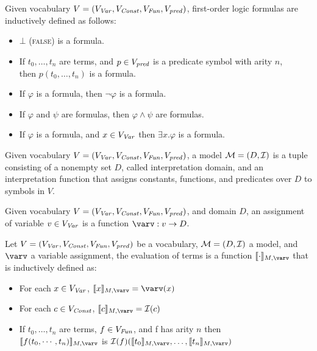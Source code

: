 \begin{mydef}[Formula]
	Given vocabulary $V = (V_{\mathit{Var}}, V_{\mathit{Const}}, V_{\mathit{Fun}}, V_{\mathit{pred}})$, first-order logic formulas are inductively defined as follows:
	\begin{itemize}
		\item $\bot$ (\textsc{false}) is a formula.
		\item If  $t_0, \ldots, t_n$ are terms, and $p \in V_{\mathit{pred}}$ is a predicate symbol with arity $n$, \\ then $p(t_0, \ldots, t_n)$ is a formula.
		\item If $\varphi$ is a formula, then $\neg \varphi$ is a formula.
		\item If $\varphi$ and $\psi$ are formulas, then $\varphi \land \psi$ are formulas.
		\item If $\varphi$ is a formula, and $x \in V_{\mathit{Var}}$ then $\exists x. \varphi$ is a formula.
	\end{itemize}
\end{mydef} \vspace*{1cm} \par

\begin{mydef}[Model]
	Given vocabulary $V = (V_{\mathit{Var}}, V_{\mathit{Const}}, V_{\mathit{Fun}}, V_{\mathit{pred}})$, a model $\mathcal{M} = (D, \mathcal{I})$ is a tuple consisting of a nonempty set $D$, called interpretation domain, and an interpretation function \interpret that assigns constants, functions, and predicates over $D$ to symbols in $V$.
\end{mydef}

\begin{mydef}
	Given vocabulary $V = (V_{\mathit{Var}}, V_{\mathit{Const}}, V_{\mathit{Fun}}, V_{\mathit{pred}})$, and domain $D$, an assignment of variable $v \in V_{\mathit{Var}}$ is a function $\varv: v \rightarrow D$.
\end{mydef}

\begin{mydef}
	Let $V = (V_{\mathit{Var}}, V_{\mathit{Const}}, V_{\mathit{Fun}}, V_{\mathit{pred}})$ be a vocabulary, $\mathcal{M} = (D, \mathcal{I})$ a model, and $\varv$ a variable assignment, the evaluation of terms is a function $\eval{\cdot}$ that is inductively defined as:
	\begin{itemize}
		\item For each $x \in V_{\mathit{Var}}$, $\eval{x} = \varv(x)$
		\item For each $c \in V_{\mathit{Const}}$, $\eval{c} = \interpret(c)$
		\item If $t_0, \ldots, t_n$ are terms, $f \in V_{\mathit{Fun}}$, and f has arity $n$ then \\ $\eval{f(t_0, \cdots, t_n)}$ is $\interpret(f)(\eval{t_0}, \ldots, \eval{t_n})$
	\end{itemize}
\end{mydef}

